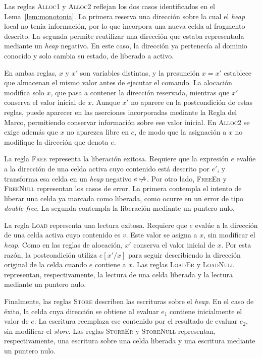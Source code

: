 \documentclass[a4paper,	11pt]{report}
\begin{document}
Las reglas \textsc{Alloc1} y \textsc{Alloc2} reflejan los dos casos identificados en el Lema~\ref{lem:monotonia}.
La primera reserva una dirección sobre la cual el \emph{heap} local no tenía información,
por lo que incorpora una nueva celda al fragmento descrito.
La segunda permite reutilizar una dirección que estaba representada mediante un \emph{heap} negativo.
En este caso,
la dirección ya pertenecía al dominio conocido y solo cambia su estado,
de liberado a activo.

En ambas reglas,
$x$ y $x'$ son variables distintas,
y la presunción $x = x'$ establece que almacenan el mismo valor antes de ejecutar el comando.
La alocación modifica solo $x$,
que pasa a contener la dirección reservada,
mientras que $x'$ conserva el valor inicial de $x$.
Aunque $x'$ no aparece en la postcondición de estas reglas,
puede aparecer en las aserciones incorporadas mediante la Regla del Marco,
permitiendo conservar información sobre ese valor inicial.
En \textsc{Alloc2} se exige además que $x$ no aparezca libre en $e$,
de modo que la asignación a $x$ no modifique la dirección que denota $e$.

La regla \textsc{Free} representa la liberación exitosa.
Requiere que la expresión $e$ evalúe a la dirección de una celda activa cuyo contenido está descrito por $e'$,
y transforma esa celda en un \emph{heap} negativo $e \nmapsto$.
Por otro lado,
\textsc{FreeEr} y \textsc{FreeNull} representan los casos de error.
La primera contempla el intento de liberar una celda ya marcada como liberada,
como ocurre en un error de tipo \emph{double free}.
La segunda contempla la liberación mediante un puntero nulo.

La regla \textsc{Load} representa una lectura exitosa.
Requiere que $e$ evalúe a la dirección de una celda activa cuyo contenido es $v$.
Este valor se asigna a $x$,
sin modificar el \emph{heap}.
Como en las reglas de alocación,
$x'$ conserva el valor inicial de $x$.
Por esta razón,
la postcondición utiliza $e[x' / x]$ para seguir describiendo la dirección original de la celda cuando $e$ contiene a $x$.
Las reglas \textsc{LoadEr} y \textsc{LoadNull} representan,
respectivamente, la lectura de una celda liberada y la lectura mediante un puntero nulo.

Finalmente, las reglas \textsc{Store} describen las escrituras sobre el \emph{heap}.
En el caso de éxito,
la celda cuya dirección se obtiene al evaluar $e_1$ contiene inicialmente el valor de $e$.
La escritura reemplaza ese contenido por el resultado de evaluar $e_2$,
sin modificar el \emph{store}.
Las reglas \textsc{StoreEr} y \textsc{StoreNull} representan,
respectivamente, una escritura sobre una celda liberada y una escritura mediante un puntero nulo.
\end{document}
